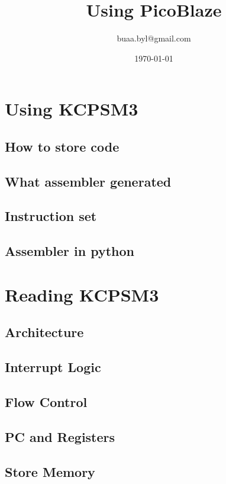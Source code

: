 \documentclass[a4paper]{book}
\begin{document}
 \begin{CJK*}{UTF8}{song} \large

\title{Using PicoBlaze}
\author{buaa.byl@gmail.com}
\date{\today}
\maketitle
\tableofcontents



\part{Using KCPSM3}
\chapter{How to store code}
\chapter{What assembler generated}
\chapter{Instruction set}
\chapter{Assembler in python}

\part{Reading KCPSM3}
\chapter{Architecture}

\chapter{Interrupt Logic}
\chapter{Flow Control}
\chapter{PC and Registers}
\chapter{Store Memory}

\end{CJK*}
\end{document}
